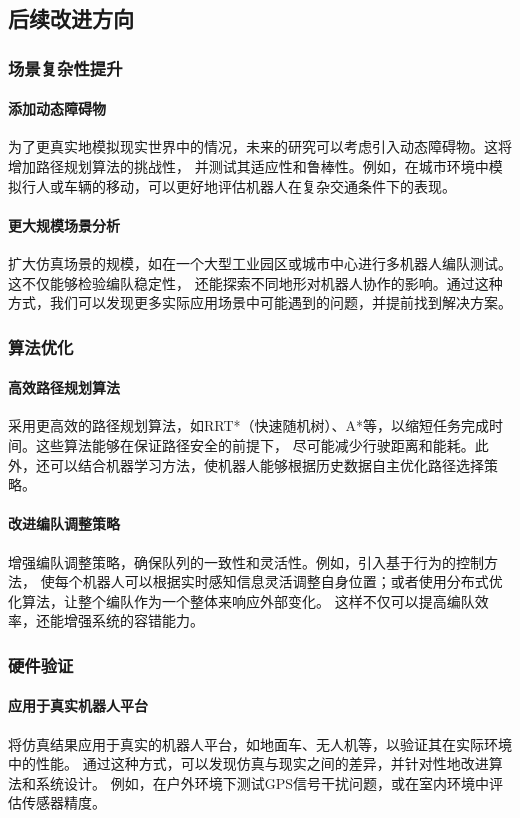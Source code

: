 \documentclass[journal,twoside,web]{ieeecolor}
\begin{document}
\subsection*{后续改进方向}
 
\subsubsection*{场景复杂性提升}
\paragraph{添加动态障碍物}
为了更真实地模拟现实世界中的情况，未来的研究可以考虑引入动态障碍物。这将增加路径规划算法的挑战性，
并测试其适应性和鲁棒性。例如，在城市环境中模拟行人或车辆的移动，可以更好地评估机器人在复杂交通条件下的表现。
 
\paragraph{更大规模场景分析}
扩大仿真场景的规模，如在一个大型工业园区或城市中心进行多机器人编队测试。这不仅能够检验编队稳定性，
还能探索不同地形对机器人协作的影响。通过这种方式，我们可以发现更多实际应用场景中可能遇到的问题，并提前找到解决方案。
 
\subsubsection*{算法优化}
\paragraph{高效路径规划算法}
采用更高效的路径规划算法，如RRT*（快速随机树）、A*等，以缩短任务完成时间。这些算法能够在保证路径安全的前提下，
尽可能减少行驶距离和能耗。此外，还可以结合机器学习方法，使机器人能够根据历史数据自主优化路径选择策略。
 
\paragraph{改进编队调整策略}
增强编队调整策略，确保队列的一致性和灵活性。例如，引入基于行为的控制方法，
使每个机器人可以根据实时感知信息灵活调整自身位置；或者使用分布式优化算法，让整个编队作为一个整体来响应外部变化。
这样不仅可以提高编队效率，还能增强系统的容错能力。
 
\subsubsection*{硬件验证}
\paragraph{应用于真实机器人平台}
将仿真结果应用于真实的机器人平台，如地面车、无人机等，以验证其在实际环境中的性能。
通过这种方式，可以发现仿真与现实之间的差异，并针对性地改进算法和系统设计。
例如，在户外环境下测试GPS信号干扰问题，或在室内环境中评估传感器精度。
 
\end{document}
